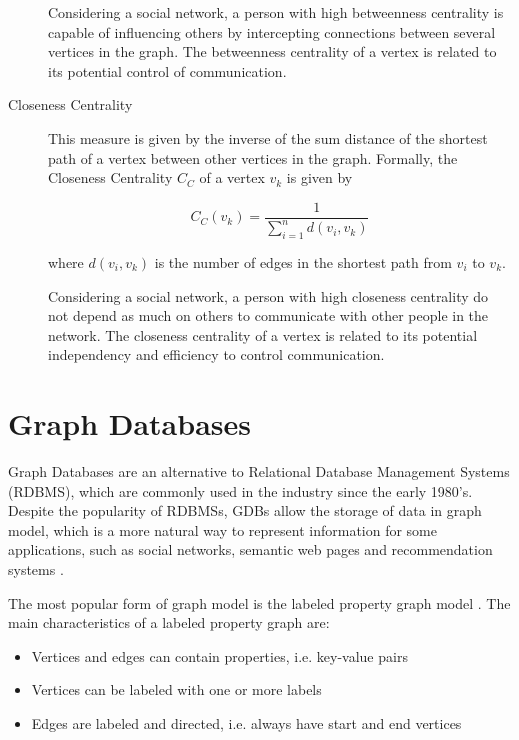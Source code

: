\begin{description}
Considering a social network, a person with high betweenness centrality is capable of influencing others by intercepting connections between several vertices in the graph. The betweenness centrality of a vertex is related to its potential control of communication.

\item[Closeness Centrality] This measure is given by the inverse of the sum distance of the shortest path of a vertex between other vertices in the graph. Formally, the Closeness Centrality $C_C$ of a vertex $v_k$ is given by

\begin{equation}
C_C(v_k) = \frac{1} {\sum_{i=1}^{n} d(v_i, v_k)}
\end{equation}

where $d(v_i, v_k)$ is the number of edges in the shortest path from $v_i$ to $v_k$.

Considering a social network, a person with high closeness centrality do not depend as much on others to communicate with other people in the network. The closeness centrality of a vertex is related to its potential independency and efficiency to control communication.
\end{description}

\section{Graph Databases}

Graph Databases are an alternative to Relational Database Management Systems (RDBMS), which are commonly used in the industry since the early 1980's. Despite the popularity of RDBMSs, GDBs allow the storage of data in graph model, which is a more natural way to represent information for some applications, such as social networks, semantic web pages and recommendation systems \cite{Miller2013}. 

The most popular form of graph model is the labeled property graph model \cite{Robinson2015}. The main characteristics of a labeled property graph are:
\begin{itemize}
\item Vertices and edges can contain properties, i.e. key-value pairs
\item Vertices can be labeled with one or more labels
\item Edges are labeled and directed, i.e. always have start and end vertices
\end{itemize}

